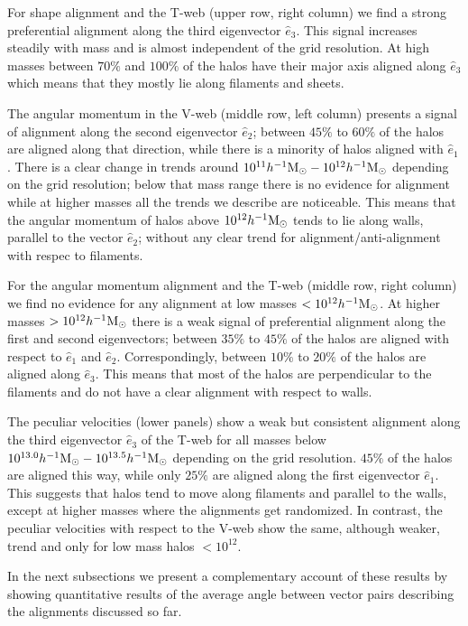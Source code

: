 \documentclass[useAMS,usenatbib]{mn2e}
\newcommand{\hMsun}{{\ifmmode{h^{-1}{\rm
        {M_{\odot}}}}\else{$h^{-1}{\rm{M_{\odot}}}$~}\fi}}
\begin{document}
For shape alignment and the T-web (upper row, right column) we find a strong
preferential alignment along the third eigenvector $\hat{e}_{3}$. This
signal increases steadily with mass and is almost independent of the
grid resolution. At high masses between $70\%$ and $100\%$ of the
halos have their major axis aligned along $\hat{e}_{3}$ which means
that they mostly lie along filaments and sheets.

The angular momentum in the V-web (middle row, left column) presents 
a signal of alignment along the second eigenvector $\hat{e}_{2}$;
between $45\%$ to $60\%$ of the halos are aligned along that
direction, while there is a minority of halos aligned with
$\hat{e}_{1}$.  There is a clear change in trends around
$10^{11}\hMsun-10^{12}\hMsun$ depending on the grid resolution;
below that mass range there is no evidence for alignment while at
higher masses all the trends we describe are noticeable. This means
that the angular momentum of halos above $10^{12}\hMsun$ tends to lie
along walls, parallel to the vector $\hat{e}_2$; without any clear
trend for alignment/anti-alignment with respec to filaments.


For the angular momentum alignment and the T-web (middle row, right
column) we find no evidence for any alignment at low masses $<10^{12}\hMsun$.
At higher masses $>10^{12}\hMsun$ there is a weak signal
of preferential alignment along the first and second eigenvectors;
between $35\%$ to $45\%$ of the halos are aligned with respect to
$\hat{e}_1$ and $\hat{e}_2$. Correspondingly, between $10\%$ to $20\%$
of the halos are aligned along $\hat{e}_{3}$. This means
that most of the halos are perpendicular to the filaments and do not
have a clear alignment with respect to walls.

The peculiar velocities (lower panels) show a weak but consistent
alignment along the third eigenvector $\hat{e}_{3}$ of the T-web for
all masses below $10^{13.0}\hMsun-10^{13.5}\hMsun$ depending on the grid
resolution. $45\%$ of the halos are aligned this way, while only $25\%$ are
aligned along the first eigenvector $\hat{e}_1$. This suggests that
halos tend to move along filaments and parallel to the walls, except
at higher masses where the alignments get randomized.  In contrast,
the peculiar velocities with respect to the V-web show the same,
although weaker, trend and only for low mass halos $<10^{12}$.


In the next subsections we present a complementary account of these
results by showing quantitative results of the average angle
between vector pairs describing the alignments discussed so far.
\end{document}
